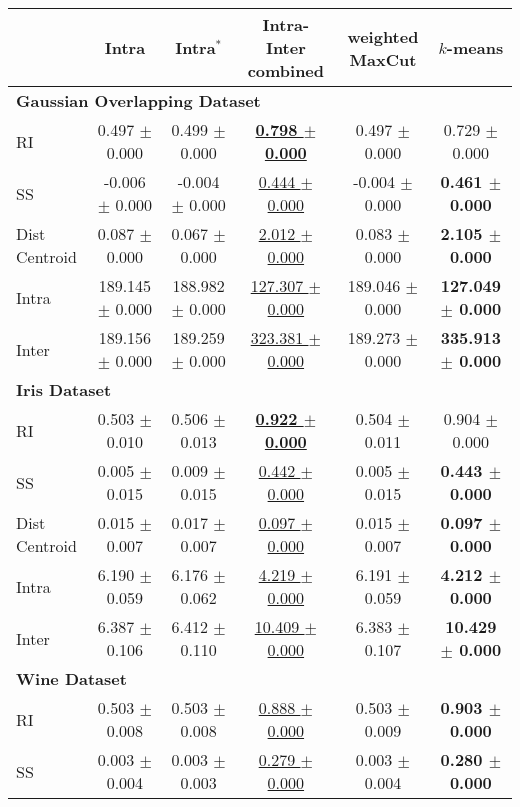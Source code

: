 \documentclass[showpacs,twocolumn,superscriptaddress]{revtex4-2}
\begin{document}
\begin{table*}[!ht]
    \centering
    \fontsize{9}{11}\selectfont
    \begin{tabular}{lccccc}
    \toprule
      & Intra & Intra$^*$ & Intra-Inter combined & weighted MaxCut & $k$-means \\
    \midrule
    \multicolumn{6}{l}{\textbf{Gaussian Overlapping Dataset}} \\
    RI & 0.497 $\pm$ 0.000 & 0.499 $\pm$ 0.000 & \underline{\textbf{0.798 $\pm$ 0.000}} & 0.497 $\pm$ 0.000 & 0.729 $\pm$ 0.000 \\
    SS & -0.006 $\pm$ 0.000 & -0.004 $\pm$ 0.000 & \underline{0.444 $\pm$ 0.000} & -0.004 $\pm$ 0.000 & \textbf{0.461 $\pm$ 0.000} \\
    Dist Centroid & 0.087 $\pm$ 0.000 & 0.067 $\pm$ 0.000 & \underline{2.012 $\pm$ 0.000} & 0.083 $\pm$ 0.000 & \textbf{2.105 $\pm$ 0.000} \\
    Intra & 189.145 $\pm$ 0.000 & 188.982 $\pm$ 0.000 & \underline{127.307 $\pm$ 0.000} & 189.046 $\pm$ 0.000 & \textbf{127.049 $\pm$ 0.000} \\
    Inter & 189.156 $\pm$ 0.000 & 189.259 $\pm$ 0.000 & \underline{323.381 $\pm$ 0.000} & 189.273 $\pm$ 0.000 & \textbf{335.913 $\pm$ 0.000} \\
    \midrule
    \multicolumn{6}{l}{\textbf{Iris Dataset}} \\
    RI & 0.503 $\pm$ 0.010 & 0.506 $\pm$ 0.013 & \underline{\textbf{0.922 $\pm$ 0.000}} & 0.504 $\pm$ 0.011 & 0.904 $\pm$ 0.000 \\
    SS & 0.005 $\pm$ 0.015 & 0.009 $\pm$ 0.015 & \underline{0.442 $\pm$ 0.000} & 0.005 $\pm$ 0.015 & \textbf{0.443 $\pm$ 0.000} \\
    Dist Centroid & 0.015 $\pm$ 0.007 & 0.017 $\pm$ 0.007 & \underline{0.097 $\pm$ 0.000} & 0.015 $\pm$ 0.007 & \textbf{0.097 $\pm$ 0.000} \\
    Intra & 6.190 $\pm$ 0.059 & 6.176 $\pm$ 0.062 & \underline{4.219 $\pm$ 0.000} & 6.191 $\pm$ 0.059 & \textbf{4.212 $\pm$ 0.000} \\
    Inter & 6.387 $\pm$ 0.106 & 6.412 $\pm$ 0.110 & \underline{10.409 $\pm$ 0.000} & 6.383 $\pm$ 0.107 & \textbf{10.429 $\pm$ 0.000} \\
    \midrule
    \multicolumn{6}{l}{\textbf{Wine Dataset}} \\
    RI & 0.503 $\pm$ 0.008 & 0.503 $\pm$ 0.008 & \underline{0.888 $\pm$ 0.000} & 0.503 $\pm$ 0.009 & \textbf{0.903 $\pm$ 0.000} \\
    SS & 0.003 $\pm$ 0.004 & 0.003 $\pm$ 0.003 & \underline{0.279 $\pm$ 0.000} & 0.003 $\pm$ 0.004 & \textbf{0.280 $\pm$ 0.000} \\

\end{tabular}
\end{table*}
\end{document}
